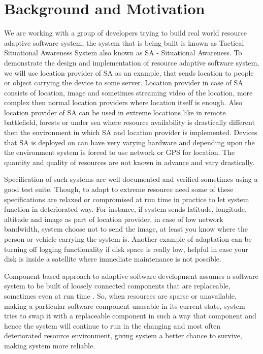 \section{Background and Motivation}

We are working with a group of developers trying to build real world resource adaptive software system, the system that is being built is known as Tactical Situational Awareness System also known as SA - Situational Awareness. To demonstrate the design and implementation of resource adaptive software system, we will use location provider of SA as an example, that sends location to people or object carrying the device to some server. Location provider in case of SA consists of location, image and sometimes streaming video of the location, more complex then normal location providers where location itself is enough. Also location provider of SA can be used in extreme locations like in remote battlefield, forests or under sea where resource availability is drastically different then the environment in which SA and location provider is implemented. Devices that SA is deployed on can have very varying hardware and depending upon the the environment system is forced to use network or GPS for location. The quantity and quality of resources are not known in advance and vary drastically.

Specification of such systems are well documented and verified sometimes using a good test suite. Though, to adapt to extreme resource need some of these specifications are relaxed or compromised at run time in practice to let system function in deteriorated way. For instance, if system sends latitude, longitude, altitude and image as part of location provider, in case of low network bandwidth, system choose not to send the image, at least you know where the person or vehicle carrying the system is. Another example of adaptation can be turning off logging functionality if disk space is really low, helpful in case your disk is inside a satellite where immediate maintenance is not possible.

Component based approach to adaptive software development assumes a software system to be built of loosely connected components that are replaceable, sometimes even at run time \cite{architectureBasedAdaptation}. So, when resources are sparse or unavailable, making a particular software component unusable in its current state, system tries to swap it with a replaceable component in such a way that component and hence the system will continue to run in the changing and most often deteriorated resource environment, giving system a better chance to survive, making system more reliable.

